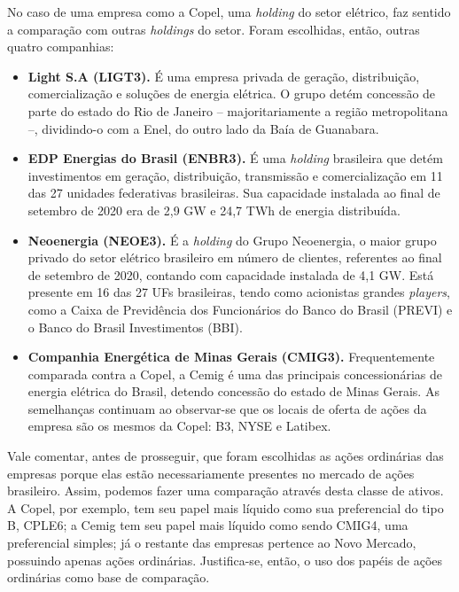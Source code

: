 \documentclass[grad,numbers]{coppe}
\providecommand{\tightlist}{%
  \setlength{\itemsep}{0pt}\setlength{\parskip}{0pt}}
\begin{document}
  No caso de uma empresa como a Copel, uma \emph{holding} do setor elétrico, faz sentido a comparação com outras \emph{holdings} do setor. Foram escolhidas, então, outras quatro companhias:
  \begin{itemize}
  \tightlist
  \item
    \textbf{Light S.A (LIGT3).} É uma empresa privada de geração, distribuição, comercialização e soluções de energia elétrica. O grupo detém concessão de parte do estado do Rio de Janeiro -- majoritariamente a região metropolitana --, dividindo-o com a Enel, do outro lado da Baía de Guanabara.
  \item
    \textbf{EDP Energias do Brasil (ENBR3).} É uma \emph{holding} brasileira que detém investimentos em geração, distribuição, transmissão e comercialização em 11 das 27 unidades federativas brasileiras. Sua capacidade instalada ao final de setembro de 2020 era de 2,9 GW e 24,7 TWh de energia distribuída.
  \item
    \textbf{Neoenergia (NEOE3).} É a \emph{holding} do Grupo Neoenergia, o maior grupo privado do setor elétrico brasileiro em número de clientes, referentes ao final de setembro de 2020, contando com capacidade instalada de 4,1 GW. Está presente em 16 das 27 UFs brasileiras, tendo como acionistas grandes \emph{players}, como a Caixa de Previdência dos Funcionários do Banco do Brasil (PREVI) e o Banco do Brasil Investimentos (BBI).
  \item
    \textbf{Companhia Energética de Minas Gerais (CMIG3).} Frequentemente comparada contra a Copel, a Cemig é uma das principais concessionárias de energia elétrica do Brasil, detendo concessão do estado de Minas Gerais. As semelhanças continuam ao observar-se que os locais de oferta de ações da empresa são os mesmos da Copel: B3, NYSE e Latibex.
  \end{itemize}
  Vale comentar, antes de prosseguir, que foram escolhidas as ações ordinárias das empresas porque elas estão necessariamente presentes no mercado de ações brasileiro. Assim, podemos fazer uma comparação através desta classe de ativos. A Copel, por exemplo, tem seu papel mais líquido como sua preferencial do tipo B, CPLE6; a Cemig tem seu papel mais líquido como sendo CMIG4, uma preferencial simples; já o restante das empresas pertence ao Novo Mercado, possuindo apenas ações ordinárias. Justifica-se, então, o uso dos papéis de ações ordinárias como base de comparação.
\end{document}
